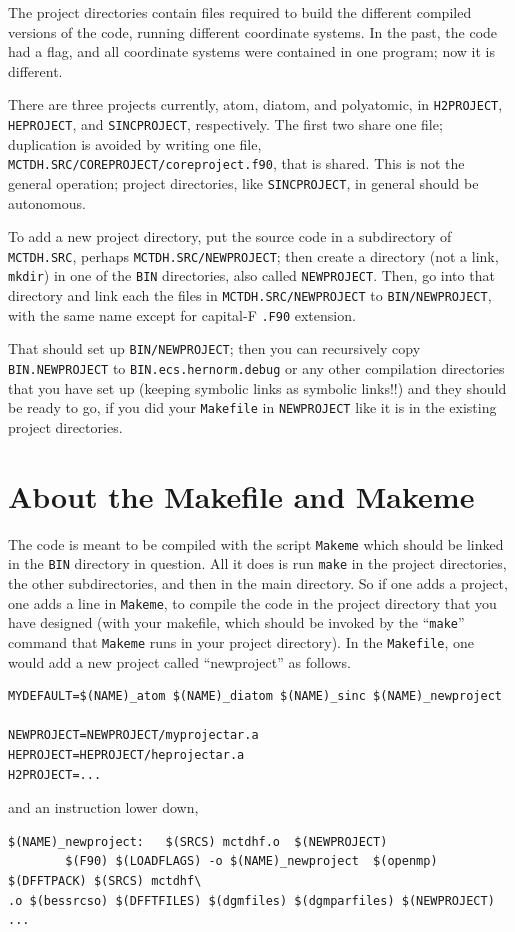 \documentclass[10pt,leqno, oneside]{book}
\begin{document}
The project directories contain files required to build the different compiled versions of the code, running different coordinate systems.  In the past,
the code had a flag, and all coordinate systems were contained in one program; now it is different.

There are three projects currently, atom, diatom, and polyatomic,
in \verb#H2PROJECT#, \verb#HEPROJECT#, and \verb#SINCPROJECT#, respectively.  The first two share one file; duplication is avoided by
 writing one file, \verb#MCTDH.SRC/COREPROJECT/coreproject.f90#,
that is shared.  This is not the general operation; project directories, like \verb#SINCPROJECT#, in general should be autonomous.  

To add a new project directory, put the source code in a subdirectory of \verb#MCTDH.SRC#, perhaps \verb#MCTDH.SRC/NEWPROJECT#; 
then create a directory (not a link, \verb#mkdir#) in one of the \verb#BIN# directories, also called \verb#NEWPROJECT#.  Then, go into that directory and
link each the files in \verb#MCTDH.SRC/NEWPROJECT# to \verb#BIN/NEWPROJECT#, with the same name except for capital-F \verb#.F90# extension.

That should set up \verb#BIN/NEWPROJECT#; then you can recursively copy \verb#BIN.NEWPROJECT# to \verb#BIN.ecs.hernorm.debug# or any
other compilation directories that you have set up (keeping symbolic links as symbolic links!!) and they should be ready to go, if you did your \verb#Makefile# in \verb#NEWPROJECT# like
it is in the existing project directories.

\section{About the Makefile and Makeme}

The code is meant to be compiled with the script \verb#Makeme# which should be linked in the \verb#BIN# directory in question.  All it does
is run \verb#make# in the project directories, the other subdirectories, and then in the main directory.  So if one adds a project, one adds a line
in \verb#Makeme#, to compile the code in the project directory that you have designed (with your makefile, which should be invoked by the
``\verb#make#'' command that \verb#Makeme# runs in your project directory).  
In the \verb#Makefile#, one would add a new project called ``newproject'' as follows.
\begin{verbatim}
MYDEFAULT=$(NAME)_atom $(NAME)_diatom $(NAME)_sinc $(NAME)_newproject

NEWPROJECT=NEWPROJECT/myprojectar.a
HEPROJECT=HEPROJECT/heprojectar.a
H2PROJECT=...
\end{verbatim}
and an instruction lower down,
\begin{verbatim}
$(NAME)_newproject:   $(SRCS) mctdhf.o  $(NEWPROJECT)
        $(F90) $(LOADFLAGS) -o $(NAME)_newproject  $(openmp) $(DFFTPACK) $(SRCS) mctdhf\
.o $(bessrcso) $(DFFTFILES) $(dgmfiles) $(dgmparfiles) $(NEWPROJECT) ...
\end{verbatim}
\end{document}
